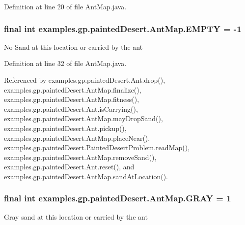 Definition at line 20 of file Ant\-Map.\-java.

\hypertarget{classexamples_1_1gp_1_1painted_desert_1_1_ant_map_a615af6a550b5cc40655f383d6f7ee97e}{
\subsubsection[{E\-M\-P\-T\-Y}]{\setlength{\rightskip}{0pt plus 5cm}final int examples.\-gp.\-painted\-Desert.\-Ant\-Map.\-E\-M\-P\-T\-Y = -\/1\hspace{0.3cm}{\ttfamily [static]}}}\label{classexamples_1_1gp_1_1painted_desert_1_1_ant_map_a615af6a550b5cc40655f383d6f7ee97e}
No Sand at this location or carried by the ant 

Definition at line 32 of file Ant\-Map.\-java.



Referenced by examples.\-gp.\-painted\-Desert.\-Ant.\-drop(), examples.\-gp.\-painted\-Desert.\-Ant\-Map.\-finalize(), examples.\-gp.\-painted\-Desert.\-Ant\-Map.\-fitness(), examples.\-gp.\-painted\-Desert.\-Ant.\-is\-Carrying(), examples.\-gp.\-painted\-Desert.\-Ant\-Map.\-may\-Drop\-Sand(), examples.\-gp.\-painted\-Desert.\-Ant.\-pickup(), examples.\-gp.\-painted\-Desert.\-Ant\-Map.\-place\-Near(), examples.\-gp.\-painted\-Desert.\-Painted\-Desert\-Problem.\-read\-Map(), examples.\-gp.\-painted\-Desert.\-Ant\-Map.\-remove\-Sand(), examples.\-gp.\-painted\-Desert.\-Ant.\-reset(), and examples.\-gp.\-painted\-Desert.\-Ant\-Map.\-sand\-At\-Location().

\hypertarget{classexamples_1_1gp_1_1painted_desert_1_1_ant_map_ac514259c0de4809ffc65dbdbddc0c9f6}{
\subsubsection[{G\-R\-A\-Y}]{\setlength{\rightskip}{0pt plus 5cm}final int examples.\-gp.\-painted\-Desert.\-Ant\-Map.\-G\-R\-A\-Y = 1\hspace{0.3cm}{\ttfamily [static]}}}\label{classexamples_1_1gp_1_1painted_desert_1_1_ant_map_ac514259c0de4809ffc65dbdbddc0c9f6}
Gray sand at this location or carried by the ant 

